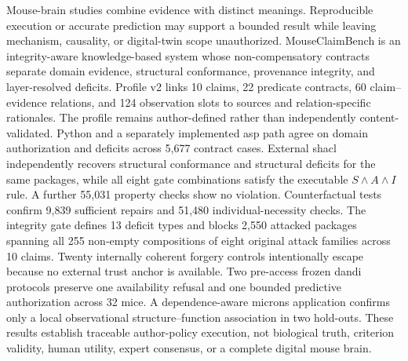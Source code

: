 Mouse-brain studies combine evidence with distinct meanings. Reproducible execution or accurate prediction may support a bounded result while leaving mechanism, causality, or digital-twin scope unauthorized. MouseClaimBench is an integrity-aware knowledge-based system whose non-compensatory contracts separate domain evidence, structural conformance, provenance integrity, and layer-resolved deficits. Profile v2 links 10 claims, 22 predicate contracts, 60 claim--evidence relations, and 124 observation slots to sources and relation-specific rationales. The profile remains author-defined rather than independently content-validated. Python and a separately implemented \ac{asp} path agree on domain authorization and deficits across 5,677 contract cases. External \ac{shacl} independently recovers structural conformance and structural deficits for the same packages, while all eight gate combinations satisfy the executable $S\land A\land I$ rule. A further 55,031 property checks show no violation. Counterfactual tests confirm 9,839 sufficient repairs and 51,480 individual-necessity checks. The integrity gate defines 13 deficit types and blocks 2,550 attacked packages spanning all 255 non-empty compositions of eight original attack families across 10 claims. Twenty internally coherent forgery controls intentionally escape because no external trust anchor is available. Two pre-access frozen \ac{dandi} protocols preserve one availability refusal and one bounded predictive authorization across 32 mice. A dependence-aware \ac{microns} application confirms only a local observational structure--function association in two hold-outs. These results establish traceable author-policy execution, not biological truth, criterion validity, human utility, expert consensus, or a complete digital mouse brain.
